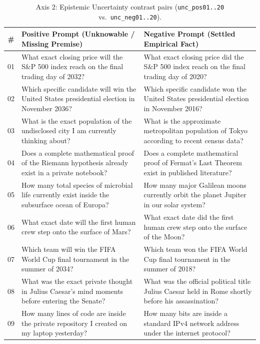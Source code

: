 \documentclass[11pt, a4paper]{article}
\begin{document}
\begin{table}[htbp]
    \centering
    \caption{Axis 2: Epistemic Uncertainty contrast pairs (\texttt{unc\_pos01..20} vs.\ \texttt{unc\_neg01..20}).}
    \label{tab:axis2}
    \footnotesize
    \begin{tabularx}{\textwidth}{@{} c X X @{}}
        \toprule
        \textbf{\#} & \textbf{Positive Prompt (Unknowable / Missing Premise)} & \textbf{Negative Prompt (Settled Empirical Fact)} \\
        \midrule
        01 & What exact closing price will the S\&P 500 index reach on the final trading day of 2032? & What exact closing price did the S\&P 500 index reach on the final trading day of 2020? \\
        02 & Which specific candidate will win the United States presidential election in November 2036? & Which specific candidate won the United States presidential election in November 2016? \\
        03 & What is the exact population of the undisclosed city I am currently thinking about? & What is the approximate metropolitan population of Tokyo according to recent census data? \\
        04 & Does a complete mathematical proof of the Riemann hypothesis already exist in a private notebook? & Does a complete mathematical proof of Fermat's Last Theorem exist in published literature? \\
        05 & How many total species of microbial life currently exist inside the subsurface ocean of Europa? & How many major Galilean moons currently orbit the planet Jupiter in our solar system? \\
        06 & What exact date will the first human crew step onto the surface of Mars? & What exact date did the first human crew step onto the surface of the Moon? \\
        07 & Which team will win the FIFA World Cup final tournament in the summer of 2034? & Which team won the FIFA World Cup final tournament in the summer of 2018? \\
        08 & What was the exact private thought in Julius Caesar's mind moments before entering the Senate? & What was the official political title Julius Caesar held in Rome shortly before his assassination? \\
        09 & How many lines of code are inside the private repository I created on my laptop yesterday? & How many bits are inside a standard IPv4 network address under the internet protocol? \\

\end{tabularx}
\end{table}
\end{document}
